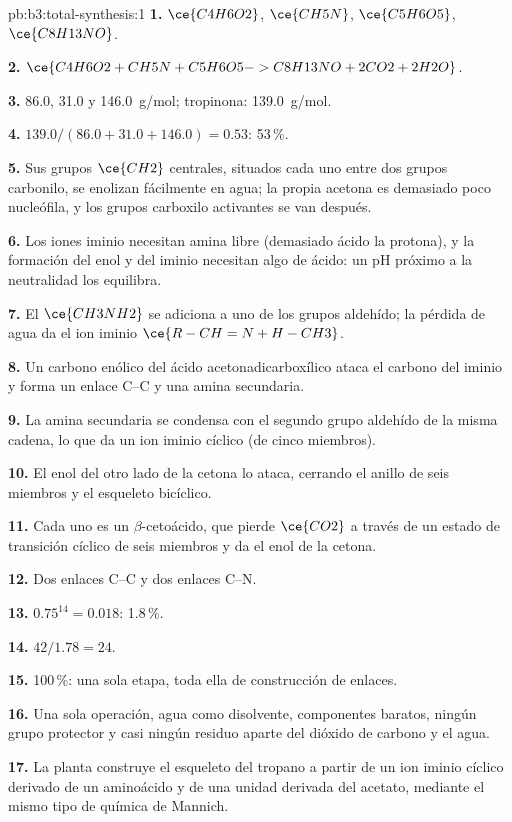 \begin{solution}{pb:b3:total-synthesis:1}
\textbf{1.} $\ce{C4H6O2}$, $\ce{CH5N}$, $\ce{C5H6O5}$, $\ce{C8H13NO}$.

\textbf{2.} $\ce{C4H6O2 + CH5N + C5H6O5 -> C8H13NO + 2CO2 + 2H2O}$.

\textbf{3.} 86.0, 31.0 y \qty{146.0}{g/mol}; tropinona: \qty{139.0}{g/mol}.

\textbf{4.} $139.0/(86.0 + 31.0 + 146.0) = 0.53$: 53\,\%.

\textbf{5.} Sus grupos $\ce{CH2}$ centrales, situados cada uno entre dos grupos carbonilo, se enolizan fácilmente en
agua; la propia acetona es demasiado poco nucleófila, y los grupos carboxilo activantes
se van después.

\textbf{6.} Los iones iminio necesitan amina libre (demasiado ácido la protona), y la
formación del enol y del iminio necesitan algo de ácido: un pH próximo a la neutralidad los equilibra.

\textbf{7.} El $\ce{CH3NH2}$ se adiciona a uno de los grupos aldehído; la pérdida de agua da el ion iminio
$\ce{R-CH=N+H-CH3}$.

\textbf{8.} Un carbono enólico del ácido acetonadicarboxílico ataca el carbono del iminio y forma un
enlace C--C y una amina secundaria.

\textbf{9.} La amina secundaria se condensa con el segundo grupo aldehído de la misma
cadena, lo que da un ion iminio cíclico (de cinco miembros).

\textbf{10.} El enol del otro lado de la cetona lo ataca, cerrando el
anillo de seis miembros y el esqueleto bicíclico.

\textbf{11.} Cada uno es un $\beta$-cetoácido, que pierde $\ce{CO2}$ a través de un estado de transición cíclico de seis
miembros y da el enol de la cetona.

\textbf{12.} Dos enlaces C--C y dos enlaces C--N.

\textbf{13.} $0.75^{14} = 0.018$: 1.8\,\%.

\textbf{14.} $42/1.78 = 24$.

\textbf{15.} 100\,\%: una sola etapa, toda ella de construcción de enlaces.

\textbf{16.} Una sola operación, agua como disolvente, componentes baratos, ningún grupo protector y
casi ningún residuo aparte del dióxido de carbono y el agua.

\textbf{17.} La planta construye el esqueleto del tropano a partir de un ion iminio cíclico
derivado de un aminoácido y de una unidad derivada del acetato, mediante el mismo tipo de química
de Mannich.


\end{solution}
